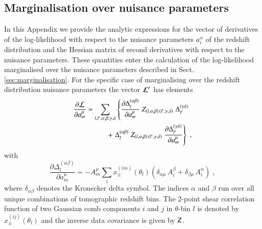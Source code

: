 \documentclass{aa}
\newcommand{\eq}[1]{\begin{equation}  #1 \end{equation}}
\newcommand{\eqa}[1]{\begin{align}   #1 \end{align}}
\newcommand{\br}[1]{\left( #1 \right)}
\newcommand{\nn}{\nonumber}
\begin{document}
\begin{appendix} 
\section{Marginalisation over nuisance parameters}
\label{ap:derivatives}
In this Appendix we provide the analytic expressions for the vector of derivatives of the log-likelihood with respect to the nuisance parameters $a_i^\alpha$ of the redshift distribution and the Hessian matrix of second derivatives with respect to the nuisance parameters. These quantities enter the calculation of the log-likelihood marginalised over the nuisance parameters described in Sect. \ref{sec:marginalisation}.
For the specific case of marginalising over the redshift distribution nuisance parameters the vector $\boldsymbol{\cal L^\prime}$ has elements
\eqa{
\frac{\partial {\cal L}}{\partial a_m^\mu} &= \sum_{l,l',\alpha,\beta,\gamma,\delta}  \left\{ \frac{\partial \Delta_l^{(\alpha \beta)}}{\partial a_m^\mu}\; Z_{(l,\alpha,\beta) \,  (l',\gamma,\delta)}\; \Delta_{l'}^{(\gamma \delta)} \right. \\ \nn
& \hspace*{1cm} + \left. \Delta_l^{(\alpha \beta)}\; Z_{(l,\alpha,\beta) \,  (l',\gamma,\delta)}\; \frac{\partial \Delta_{l'}^{(\gamma \delta)}}{\partial a_m^\mu} \right\}\;,
}
with
\eq{
\frac{\partial \Delta_l^{(\alpha \beta)}}{\partial a_m^\mu} = - A_m^\mu \sum_i x_\pm^{(im)}(\theta_l) \br{\delta_{\alpha \mu}\, A_i^\beta + \delta_{\beta \mu}\, A_i^\alpha}\;,
}
where $\delta_{\alpha \beta}$ denotes the Kronecker delta symbol. The indices $\alpha$ and $\beta$ run over all unique combinations of tomographic redshift bins. The 2-point shear correlation function of two Gaussian comb components $i$ and $j$ in $\theta$-bin $l$ is denoted by $x_\pm^{(ij)}(\theta_l)$ and the inverse data covariance is given by $\mathsf{Z}$. 


\end{appendix}
\end{document}

